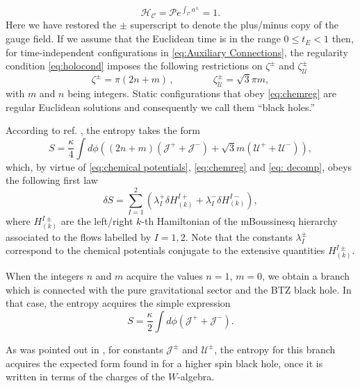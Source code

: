 \documentclass[letterpaper,11pt,oneside]{book}
\begin{document}
\begin{equation}
	\mathcal{H}_{\mathcal{C}}=\mathcal{P}e^{\int_{\mathcal{C}}a^{\pm}}=1.\label{eq:holocond}
\end{equation}
Here we have restored the $\pm$ superscript to denote the plus/minus
copy of the gauge field. If we assume that the Euclidean time is in
the range $0\leq t_{E}<1$ then, for time-independent configurations
in \eqref{eq:Auxiliary Connections}, the regularity condition \eqref{eq:holocond}
imposes the following restrictions on $\zeta^{\pm}$ and $\zeta_{\mathcal{U}}^{\pm}$
\begin{equation}
	\zeta^{\pm}=\pi\left(2n+m\right)\,,\qquad\qquad\zeta_{\mathcal{U}}^{\pm}=\sqrt{3}\pi m,\label{eq:chemreg}
\end{equation}
with $m$ and $n$ being integers. Static configurations that obey
\eqref{eq:chemreg} are regular Euclidean solutions and consequently
we call them ``black holes.''

According to ref. \cite{Grumiller:2016kcp}, the entropy takes the
form
\begin{equation}
	S=\frac{\kappa}{4}\int d\phi\left(\left(2n+m\right)\left(\mathcal{J}^{+}+\mathcal{J}^{-}\right)+\sqrt{3}m\left(\mathcal{U}^{+}+\mathcal{U}^{-}\right)\right),\label{eq:Entropy}
\end{equation}
which, by virtue of \eqref{eq:chemical potentials}, \eqref{eq:chemreg}
and \eqref{eq: decomp}, obeys the following first law 
\[
\delta S=\sum_{I=1}^{2}\left(\lambda_{I}^{+}\delta H_{\left(k\right)}^{I+}+\lambda_{I}^{-}\delta H_{\left(k\right)}^{I-}\right),
\]
where $H_{\left(k\right)}^{I\pm}$ are the left/right $k$-th Hamiltonian
of the mBoussinesq hierarchy associated to the flows labelled by $I=1,2$.
Note that the constants $\lambda_{I}^{\pm}$ correspond to the chemical
potentials conjugate to the extensive quantities $H_{\left(k\right)}^{I\pm}$.

When the integers $n$ and $m$ acquire the values $n=1$, $m=0$,
we obtain a branch which is connected with the pure gravitational
sector and the BTZ black hole. In that case, the entropy acquires
the simple expression 
\begin{equation}
	S=\frac{\kappa}{2}\int d\phi\left(\mathcal{J}^{+}+\mathcal{J}^{-}\right).\label{eq:Entropy-1}
\end{equation}

As was pointed out in \cite{Grumiller:2016kcp}, for constants $\mathcal{J}^{\pm}$
and $\mathcal{U}^{\pm}$, the entropy for this branch acquires the
expected form found in \cite{Henneaux:2013dra,Bunster:2014mua} for
a higher spin black hole, once it is written in terms of the charges
of the $W$-algebra.
\end{document}
